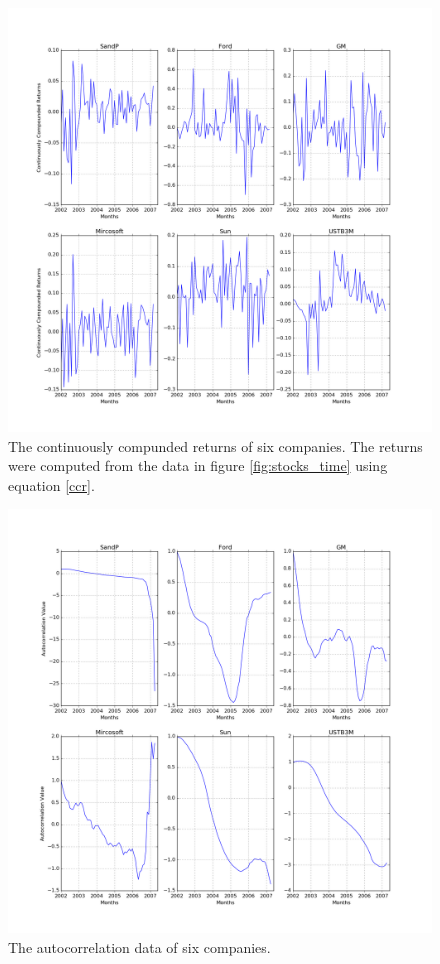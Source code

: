 \message{ !name(austin_report.tex)}\documentclass[11pt, letterpage, twocolumn]{article}
\begin{document}
\begin{figure}
  \includegraphics[width=\linewidth]{stocks_returns.png}
  \caption{
    The continuously compunded returns of six companies. The returns were
    computed from the data in figure \ref{fig:stocks_time} using equation
    \ref{ccr}.
  }
  \label{fig:stocks_returns}
\end{figure}

\begin{figure}
  \includegraphics[width=\linewidth]{stocks_ac.png}
  \caption{
    The autocorrelation data of six companies.
  }
  \label{fig:stocks_ac}
\end{figure}
\end{document}
